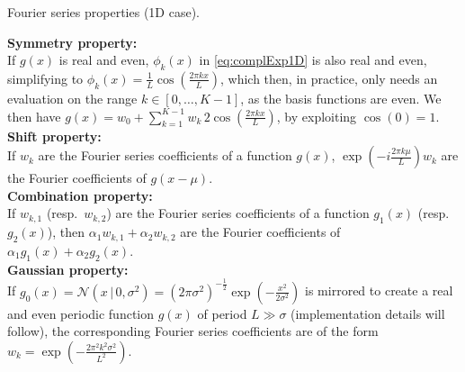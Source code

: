 \documentclass[10pt,a4paper]{article} %
\begin{document}
\begin{table}
\caption{Fourier series properties (1D case).}
\label{tab:Fourier}
\begin{mdframed}

\noindent\textbf{Symmetry property:}\\
If $g(x)$ is real and even, $\phi_k(x)$ in \eqref{eq:complExp1D} is also real and even, simplifying to $\phi_k(x) = \frac{1}{L} \cos\!\left(\frac{2\pi k x}{L}\right)$, which then, in practice, only needs an evaluation on the range $k\!\in\![0,\ldots,K\!-\!1]$, as the basis functions are even. We then have $g(x) = w_0 + \sum_{k=1}^{K\!-\!1} w_k \, 2\cos\!\left(\frac{2\pi k x}{L}\right)$, by exploiting $\cos(0)\!=\!1$.\\[-2mm]

\noindent\textbf{Shift property:}\\
If $w_k$ are the Fourier series coefficients of a function $g(x)$, $\exp(-i \frac{2\pi k \mu}{L}) w_k$ are the Fourier coefficients of $g(x-\mu)$.\\[-2mm]

\noindent\textbf{Combination property:}\\
If $w_{k,1}$ (resp.\ $w_{k,2}$) are the Fourier series coefficients of a function $g_1(x)$ (resp.\ $g_2(x)$), then $\alpha_1 w_{k,1}+\alpha_2 w_{k,2}$ are the Fourier coefficients of $\alpha_1 g_1(x)+\alpha_2 g_2(x)$.\\[-2mm]

\noindent\textbf{Gaussian property:}\\
If $g_0(x)=\mathcal{N}(x \,|\, 0, \sigma^2)=(2\pi\sigma^2)^{-\frac{1}{2}} \exp(-\frac{x^2}{2\sigma^2})$
is mirrored to create a real and even periodic function $g(x)$ of period $L\gg\sigma$ (implementation details will follow), the corresponding Fourier series coefficients are of the form $w_k=\exp(-\frac{2\pi^2 k^2 \sigma^2}{L^2})$.\\[-2mm]

\end{mdframed}
\end{table}
\end{document}
